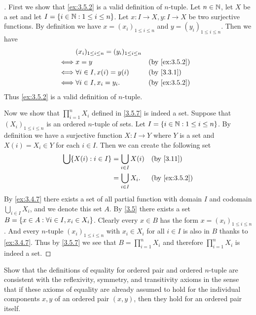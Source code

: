 \begin{proof}[]
	First we show that \cref{ex:3.5.2} is a valid definition of \(n\)-tuple.
	Let \(n \in \mathbb{N}\), let \(X\) be a set and let \(I = \left\lbrace i \in \mathbb{N} : 1 \leq i \leq n\right\rbrace\).
	Let \(x : I \to X, y : I \to X\) be two surjective functions.
	By definition we have \(x = (x_i)_{1 \leq i \leq n}\) and \(y = (y_i)_{1 \leq i \leq n}\).
	Then we have
	\begin{align*}
		     & (x_i)_{1 \leq i \leq n} = (y_i)_{1 \leq i \leq n}                    \\
		\iff & x = y                                             &  & \by{ex:3.5.2} \\
		\iff & \forall i \in I, x(i) = y(i)                      &  & \by{3.3.1}    \\
		\iff & \forall i \in I, x_i = y_i.                       &  & \by{ex:3.5.2}
	\end{align*}
	Thus \cref{ex:3.5.2} is a valid definition of \(n\)-tuple.

	Now we show that \(\prod_{i = 1}^n X_i\) defined in \cref{3.5.7} is indeed a set.
	Suppose that \((X_i)_{1 \leq i \leq n}\) is an ordered \(n\)-tuple of sets.
	Let \(I = \left\lbrace i \in \mathbb{N} : 1 \leq i \leq n\right\rbrace\).
	By definition we have a surjective function \(X : I \to Y\) where \(Y\) is a set and \(X(i) = X_i \in Y\) for each \(i \in I\).
	Then we can create the following set
	\begin{align*}
		\bigcup \set{X(i) : i \in I} & = \bigcup_{i \in I} X(i) &  & \by{3.11}     \\
		                             & = \bigcup_{i \in I} X_i. &  & \by{ex:3.5.2}
	\end{align*}
	By \cref{ex:3.4.7} there exists a set of all partial function with domain \(I\) and codomain \(\bigcup_{i \in I} X_i\), and we denote this set \(A\).
	By \cref{3.5} there exists a set \(B = \left\lbrace x \in A : \forall i \in I, x_i \in X_i\right\rbrace\).
	Clearly every \(x \in B\) has the form \(x = (x_i)_{1 \leq i \leq n}\).
	And every \(n\)-tuple \((x_i)_{1 \leq i \leq n}\) with \(x_i \in X_i\) for all \(i \in I\) is also in \(B\) thanks to \cref{ex:3.4.7}.
	Thus by \cref{3.5.7} we see that \(B = \prod_{i = 1}^n X_i\) and therefore \(\prod_{i = 1}^n X_i\) is indeed a set.
\end{proof}

\begin{ex}\label{ex:3.5.3}
	Show that the definitions of equality for ordered pair and ordered \(n\)-tuple are consistent with the reflexivity, symmetry, and transitivity axioms in the sense that if these axioms of equality are already assumed to hold for the individual components \(x, y\) of an ordered pair \((x, y)\), then they hold for an ordered pair itself.
\end{ex}

